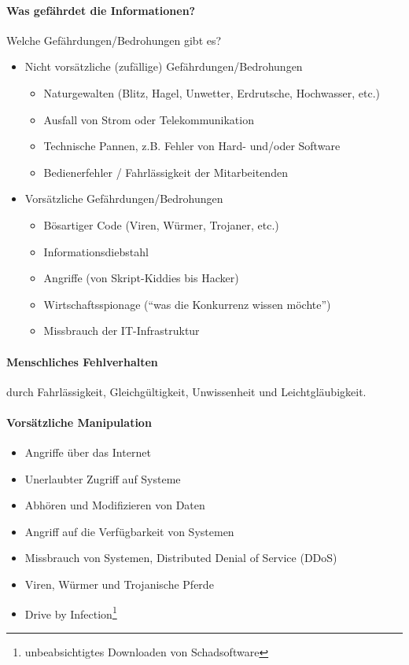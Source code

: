 \paragraph*{Was gefährdet die Informationen?} Welche Gefährdungen/Bedrohungen gibt es?
\begin{itemize}
    \item Nicht vorsätzliche (zufällige) Gefährdungen/Bedrohungen
    \begin{itemize}
        \item Naturgewalten (Blitz, Hagel, Unwetter, Erdrutsche, Hochwasser, etc.)
        \item Ausfall von Strom oder Telekommunikation
        \item Technische Pannen, z.B. Fehler von Hard- und/oder Software
        \item Bedienerfehler / Fahrlässigkeit der Mitarbeitenden
    \end{itemize}
    \item Vorsätzliche Gefährdungen/Bedrohungen
    \begin{itemize}
        \item Bösartiger Code (Viren, Würmer, Trojaner, etc.)
        \item Informationsdiebstahl
        \item Angriffe (von Skript-Kiddies bis Hacker)
        \item Wirtschaftsspionage ("`was die Konkurrenz wissen möchte"')
        \item Missbrauch der IT-Infrastruktur
    \end{itemize}
\end{itemize}

\paragraph*{Menschliches Fehlverhalten}durch Fahrlässigkeit, Gleichgültigkeit, Unwissenheit und Leichtgläubigkeit.

\paragraph*{Vorsätzliche Manipulation}
\begin{itemize}
    \item Angriffe über das Internet
    \item Unerlaubter Zugriff auf Systeme
    \item Abhören und Modifizieren von Daten
    \item Angriff auf die Verfügbarkeit von Systemen
    \item Missbrauch von Systemen, Distributed Denial of Service (DDoS)
    \item Viren, Würmer und Trojanische Pferde
    \item Drive by Infection\footnote{unbeabsichtigtes Downloaden von Schadsoftware}
\end{itemize}

